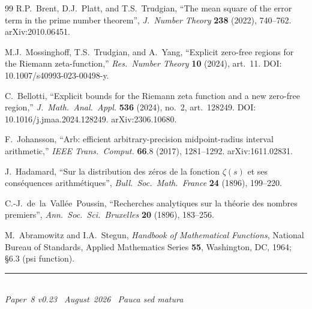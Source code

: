 \documentclass[11pt]{article}
\begin{document}
\begin{thebibliography}{99}
R.P.~Brent, D.J.~Platt, and T.S.~Trudgian,
``The mean square of the error term in the prime number theorem'',
\emph{J.\ Number Theory} \textbf{238} (2022), 740--762.
arXiv:2010.06451.

M.J.~Mossinghoff, T.S.~Trudgian, and A.~Yang,
``Explicit zero-free regions for the Riemann zeta-function,''
\textit{Res.\ Number Theory} \textbf{10} (2024), art.~11.
DOI: 10.1007/s40993-023-00498-y.

C.~Bellotti,
``Explicit bounds for the Riemann zeta function
and a new zero-free region,''
\textit{J.\ Math.\ Anal.\ Appl.} \textbf{536} (2024),
no.~2, art.~128249.
DOI: 10.1016/j.jmaa.2024.128249.
arXiv:2306.10680.

F.~Johansson,
``Arb: efficient arbitrary-precision midpoint-radius interval arithmetic,''
\emph{IEEE Trans.\ Comput.} \textbf{66}.8 (2017), 1281--1292.
arXiv:1611.02831.

J.~Hadamard,
``Sur la distribution des z\'{e}ros de la fonction $\zeta(s)$
et ses cons\'{e}quences arithm\'{e}tiques'',
\emph{Bull.\ Soc.\ Math.\ France} \textbf{24} (1896), 199--220.

C.-J.~de~la~Vall\'{e}e~Poussin,
``Recherches analytiques sur la th\'{e}orie des nombres premiers'',
\emph{Ann.\ Soc.\ Sci.\ Bruxelles} \textbf{20} (1896), 183--256.

M.~Abramowitz and I.A.~Stegun,
\emph{Handbook of Mathematical Functions},
National Bureau of Standards, Applied Mathematics Series \textbf{55},
Washington, DC, 1964; \S6.3 (psi function).

\end{thebibliography}

\enlargethispage{3\baselineskip}
\vspace*{\fill}
\begin{minipage}{\linewidth}
\rule{\linewidth}{0.4pt}\smallskip\\
\small\emph{Paper~8 v0.23 \textperiodcentered\ August~2026
\textperiodcentered\ Pauca sed matura}
\end{minipage}
\end{document}
